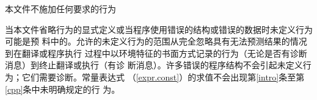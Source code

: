 本文件不施加任何要求的行为

\begin{note}[\noindent]
当本文件省略行为的显式定义或当程序使用错误的结构或错误的数据时未定义行为可能是预
料中的。允许的未定义行为的范围从完全忽略具有无法预测结果的情况到在翻译或程序执行
过程中以环境特征的书面方式记录的行为（无论是否有诊断消息）到终止翻译或执行（有诊
断消息）。许多错误的程序结构不会引起未定义行为；它们需要诊断。常量表达式
（\ref{expr.const}）的求值不会出现第\ref{intro}条至第\ref{cpp}条中未明确规定的行
为。
\end{note}
